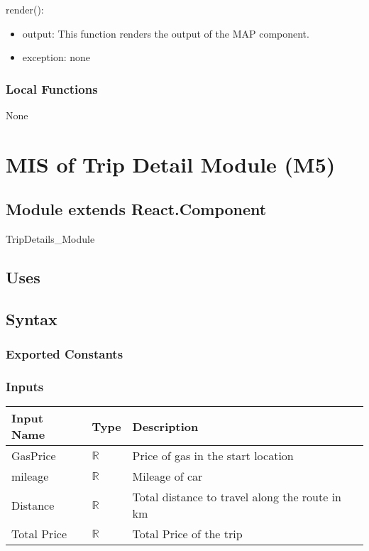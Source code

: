\documentclass[12pt, titlepage]{article}
\begin{document}
\noindent render():
\begin{itemize}
\item output: This function renders the output of the MAP component.
\item exception: none
\end{itemize}

\subsubsection{Local Functions}

None

\newpage



\section{MIS of Trip Detail Module (M5)} 

\label{Module} 

\subsection{Module extends React.Component}

TripDetails\_Module

\subsection{Uses}


\subsection{Syntax}

\subsubsection{Exported Constants}

\subsubsection{Inputs}
\begin{tabular}{| l | l | l |}
  \hline
  \textbf{Input Name} & \textbf{Type} & \textbf{Description}\\
  \hline
  GasPrice & $\mathbb{R}$ & Price of gas in the start location \\
  \hline
  mileage & $\mathbb{R}$ & Mileage of car \\
  \hline
  Distance & $\mathbb{R}$  & Total distance to travel along the route in km \\
  \hline
  Total Price & $\mathbb{R}$ & Total Price of the trip \\
  \hline
\end{tabular}
\end{document}
